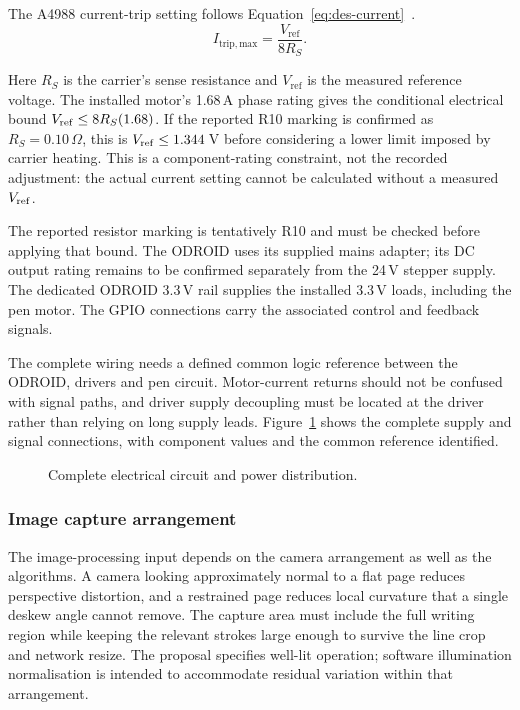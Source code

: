 The A4988 current-trip setting follows Equation~\ref{eq:des-current}~\cite[p.~9]{a4988ds}.
\begin{equation}
I_{\mathrm{trip,max}}=\frac{V_{\mathrm{ref}}}{8R_S}.
\label{eq:des-current}
\end{equation}

Here $R_S$ is the carrier's sense resistance and $V_{\mathrm{ref}}$ is the measured reference voltage. The installed motor's 1.68\,A phase rating gives the conditional electrical bound $V_{\rm ref}\leq8R_S(1.68)$. If the reported R10 marking is confirmed as $R_S=0.10\,\Omega$, this is $V_{\rm ref}\leq1.344$\,V before considering a lower limit imposed by carrier heating. This is a component-rating constraint, not the recorded adjustment: the actual current setting cannot be calculated without a measured $V_{\rm ref}$.

The reported resistor marking is tentatively R10 and must be checked before applying that bound. The ODROID uses its supplied mains adapter; its DC output rating remains to be confirmed separately from the 24\,V stepper supply. The dedicated ODROID 3.3\,V rail supplies the installed 3.3\,V loads, including the pen motor. The GPIO connections carry the associated control and feedback signals.

The complete wiring needs a defined common logic reference between the ODROID, drivers and pen circuit. Motor-current returns should not be confused with signal paths, and driver supply decoupling must be located at the driver rather than relying on long supply leads. Figure~\ref{fig:des-complete-circuit} shows the complete supply and signal connections, with component values and the common reference identified.


\begin{figure}[!htbp]\centering
{}
\caption{Complete electrical circuit and power distribution.}
\label{fig:des-complete-circuit}
\end{figure}


\subsubsection{Image capture arrangement}
\label{sec:des-camera}
The image-processing input depends on the camera arrangement as well as the algorithms. A camera looking approximately normal to a flat page reduces perspective distortion, and a restrained page reduces local curvature that a single deskew angle cannot remove. The capture area must include the full writing region while keeping the relevant strokes large enough to survive the line crop and network resize. The proposal specifies well-lit operation; software illumination normalisation is intended to accommodate residual variation within that arrangement.


